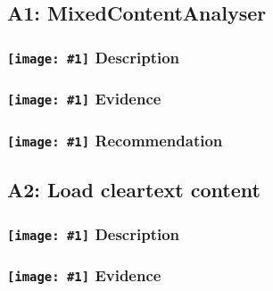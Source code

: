 \documentclass[12p]{article}
\newcommand{\icon}[1]{\texttt{[image: \#1]}}
\begin{document}
\subsection{A1: MixedContentAnalyser}
\subsubsection*{\protect\icon{/home/miki/Documents/GITHUB/AndroidPermissions/python/vulns/report_icons/basic_sheet.png} Description}

\subsubsection*{\protect\icon{/home/miki/Documents/GITHUB/AndroidPermissions/python/vulns/report_icons/basic_magnifier.png} Evidence}

\subsubsection*{\protect\icon{/home/miki/Documents/GITHUB/AndroidPermissions/python/vulns/report_icons/basic_todo.png} Recommendation}

\subsection{A2: Load cleartext content}
\subsubsection*{\protect\icon{/home/miki/Documents/GITHUB/AndroidPermissions/python/vulns/report_icons/basic_sheet.png} Description}

\subsubsection*{\protect\icon{/home/miki/Documents/GITHUB/AndroidPermissions/python/vulns/report_icons/basic_magnifier.png} Evidence}


\end{document}
